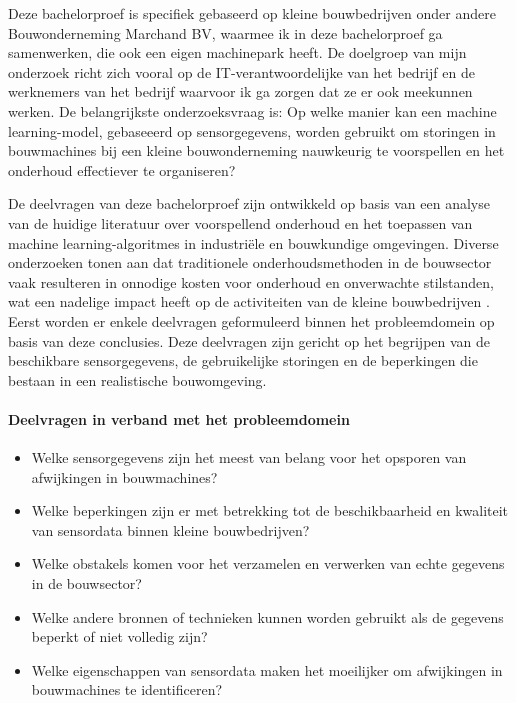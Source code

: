 Deze bachelorproef is specifiek gebaseerd op kleine bouwbedrijven onder andere Bouwonderneming Marchand BV, waarmee ik in deze bachelorproef ga samenwerken, die ook een eigen machinepark heeft. De doelgroep van mijn onderzoek richt zich vooral op de IT-verantwoordelijk\-e van het bedrijf en de werknemers van het bedrijf waarvoor ik ga zorgen dat ze er ook meekunnen werken. De belangrijkste onderzoeksvraag is: Op welke manier kan een machine learning-model, gebaseeerd op sensorgegevens, worden gebruikt om storingen in bouwmachines bij een kleine bouwonderneming nauwkeurig te voorspellen en het onderhoud effectiever te organiseren? 

De deelvragen van deze bachelorproef zijn ontwikkeld op basis van een analyse van de huidige literatuur over voorspellend onderhoud en het toepassen van machine learning-algoritmes in industriële en bouwkundige omgevingen. Diverse onderzoeken tonen aan dat traditionele onderhoudsmethoden in de bouwsector vaak resulteren in onnodige kosten voor onderhoud en onverwachte stilstanden, wat een nadelige impact heeft op de activiteiten van de kleine bouwbedrijven \autocite{Carvalho2019, Mikulic2024, ErRatby2025}. Eerst worden er enkele deelvragen geformuleerd binnen het probleemdomein op basis van deze conclusies. Deze deelvragen zijn gericht op het begrijpen van de beschikbare sensorgegevens, de gebruikelijke storingen en de beperkingen die bestaan in een realistische bouwomgeving.

\paragraph{Deelvragen in verband met het probleemdomein}

\begin{itemize}
    \item Welke sensorgegevens zijn het meest van belang voor het opsporen van afwijkingen in bouwmachines?
    
    \item Welke beperkingen zijn er met betrekking tot de beschikbaarheid en kwaliteit van sensordata binnen kleine bouwbedrijven?
    
    \item Welke obstakels komen voor het verzamelen en verwerken van echte gegevens in de bouwsector?
    
    \item Welke andere bronnen of technieken kunnen worden gebruikt als de gegevens beperkt of niet volledig zijn?
    
    \item Welke eigenschappen van sensordata maken het moeilijker om afwijkingen in bouwmachines te identificeren?
\end{itemize}

